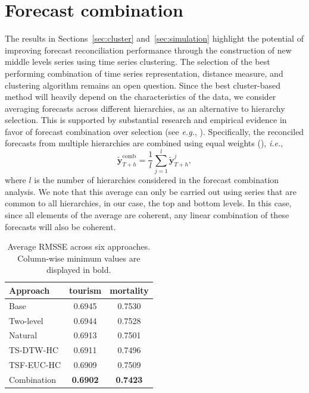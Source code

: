 \documentclass[a4paper,review,12pt,authoryear]{elsarticle}
\begin{document}
\section{Forecast combination}
\label{sec:combination}

The results in Sections~\ref{sec:cluster} and~\ref{sec:simulation} highlight the potential of improving forecast reconciliation performance through the construction of new middle levels series using time series clustering. The selection of the best performing combination of time series representation, distance measure, and clustering algorithm remains an open question. Since the best cluster-based method will heavily depend on the characteristics of the data, %
we consider averaging forecasts across different hierarchies, as an alternative to hierarchy selection. This is supported by substantial research and empirical evidence in favor of forecast combination over selection (see \textit{e.g.}, \citealp{elliottForecastingEconomicsFinance2016}). Specifically, the reconciled forecasts from multiple hierarchies are combined using equal weights (\citealp{wangForecastCombinations50year2022}), \textit{i.e.},
\[
  \tilde{\boldsymbol{y}}_{T+h}^{\text{comb}} = \frac{1}{l} \sum_{j=1}^l \tilde{\boldsymbol{y}}_{T+h}^j,
\] 
{where $l$ is the number of hierarchies considered in the forecast combination analysis.}
We note that this average can only be carried out using series that are common to all hierarchies, in our case, the top and bottom levels. In this case, since all elements of the average are coherent, any linear combination of these forecasts will also be coherent. \\



\begin{table}[!h]
    \centering
    \caption{\label{tab:P4_RMSSE}Average RMSSE across six approaches. Column-wise minimum values are displayed in bold.}
    \begin{tabular}{lcc}\toprule
       Approach & tourism & mortality \\ \midrule
        Base & 0.6945 & 0.7530 \\ 
        Two-level & 0.6944 & 0.7528 \\ 
        Natural & 0.6913 & 0.7501 \\ 
        TS-DTW-HC & 0.6911 & 0.7496 \\ 
        TSF-EUC-HC & 0.6909 & 0.7509 \\ 
        Combination & \textbf{0.6902} & \textbf{0.7423} \\ \bottomrule
    \end{tabular}
\end{table}
\end{document}
